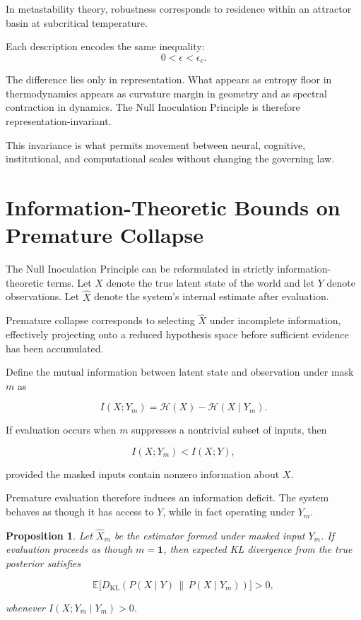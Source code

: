 \documentclass[11pt]{article}
\newtheorem{proposition}{Proposition}
\theoremstyle{remark}
\begin{document}
In metastability theory, robustness corresponds to residence within an attractor basin at subcritical temperature.

Each description encodes the same inequality:
\[
0 < \epsilon < \epsilon_c.
\]

The difference lies only in representation. What appears as entropy floor in thermodynamics appears as curvature margin in geometry and as spectral contraction in dynamics. The Null Inoculation Principle is therefore representation-invariant.

This invariance is what permits movement between neural, cognitive, institutional, and computational scales without changing the governing law.

\section{Information-Theoretic Bounds on Premature Collapse}
\label{sec:information_bounds}

The Null Inoculation Principle can be reformulated in strictly information-theoretic terms. Let $X$ denote the true latent state of the world and let $Y$ denote observations. Let $\hat{X}$ denote the system's internal estimate after evaluation.

Premature collapse corresponds to selecting $\hat{X}$ under incomplete information, effectively projecting onto a reduced hypothesis space before sufficient evidence has been accumulated.

Define the mutual information between latent state and observation under mask $m$ as

\[
I(X; Y_m) = \mathcal{H}(X) - \mathcal{H}(X \mid Y_m).
\]

If evaluation occurs when $m$ suppresses a nontrivial subset of inputs, then

\[
I(X; Y_m) < I(X; Y),
\]

provided the masked inputs contain nonzero information about $X$.

Premature evaluation therefore induces an information deficit. The system behaves as though it has access to $Y$, while in fact operating under $Y_m$.

\begin{proposition}
Let $\hat{X}_m$ be the estimator formed under masked input $Y_m$. If evaluation proceeds as though $m = \mathbf{1}$, then expected KL divergence from the true posterior satisfies

\[
\mathbb{E}\big[D_{\mathrm{KL}}(P(X \mid Y) \,\|\, P(X \mid Y_m))\big] > 0,
\]

whenever $I(X; Y_{\bar m} \mid Y_m) > 0$.
\end{proposition}
\end{document}
